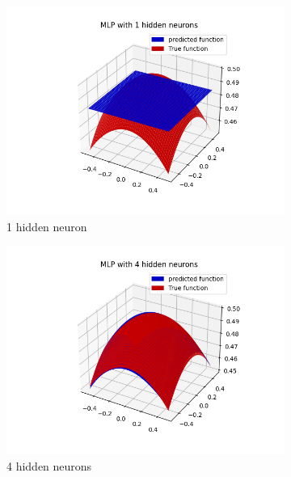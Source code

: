 \documentclass[a4paper]{article}
\begin{document}
\begin{figure}[ht]
    \centering
    \begin{subfigure}{0.4\textwidth}
        \centering
        \includegraphics[width=\textwidth]{Labs/Lab 1/Lab 1b/Figure/plots-1-hidden-neurons.png}
        \caption{1 hidden neuron}
    \end{subfigure}
    \hfill
    \begin{subfigure}{0.4\textwidth}
        \centering
        \includegraphics[width=\textwidth]{Labs/Lab 1/Lab 1b/Figure/plots-4-hidden-neurons.png}
        \caption{4 hidden neurons}
    \end{subfigure}
    \begin{subfigure}{0.4\textwidth}
        \centering

\end{subfigure}
\end{figure}
\end{document}
